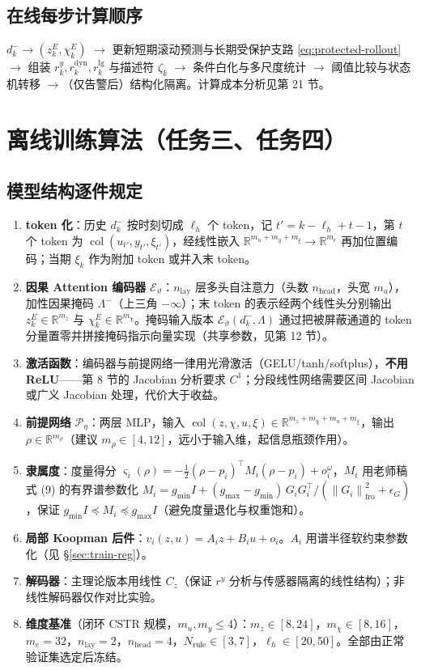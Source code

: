 \documentclass[11pt,a4paper]{ctexart}
\theoremstyle{remark}
\newcommand{\col}{\operatorname{col}}
\newcommand{\R}{\mathbb{R}}
\newcommand{\norm}[1]{\left\|#1\right\|}
\newcommand{\Enc}{\mathcal{E}_{\vartheta}}
\newcommand{\Prem}{\mathcal{P}_{\eta}}
\begin{document}
\subsection{在线每步计算顺序}

$d^-_k\to(z^E_k,\chi^E_k)$ $\to$ 更新短期滚动预测与长期受保护支路 \eqref{eq:protected-rollout} $\to$ 组装 $r^y_k,r^{\mathrm{dyn}}_{k},r^{\mathrm{lg}}_k$ 与描述符 $\zeta_k$ $\to$ 条件白化与多尺度统计 $\to$ 阈值比较与状态机转移 $\to$（仅告警后）结构化隔离。计算成本分析见第 21 节。

\section{离线训练算法（任务三、任务四）}

\subsection{模型结构逐件规定}

\begin{enumerate}
\item \textbf{token 化}：历史 $d^-_k$ 按时刻切成 $\ell_h$ 个 token，记 $t'=k-\ell_h+t-1$，第 $t$ 个 token 为 $\col(u_{t'},y_{t'},\xi_{t'})$，经线性嵌入 $\R^{m_u+m_y+m_\xi}\to\R^{m_e}$ 再加位置编码；当期 $\xi_k$ 作为附加 token 或并入末 token。
\item \textbf{因果 Attention 编码器} $\Enc$：$n_{\mathrm{lay}}$ 层多头自注意力（头数 $n_{\mathrm{head}}$，头宽 $m_a$），加性因果掩码 $\Lambda^-$（上三角 $-\infty$）；末 token 的表示经两个线性头分别输出 $z^E_k\in\R^{m_z}$ 与 $\chi^E_k\in\R^{m_\chi}$。掩码输入版本 $\Enc(d^-_k,\Lambda)$ 通过把被屏蔽通道的 token 分量置零并拼接掩码指示向量实现（共享参数，见第 12 节）。
\item \textbf{激活函数}：编码器与前提网络一律用光滑激活（GELU/tanh/softplus），\textbf{不用 ReLU}——第 8 节的 Jacobian 分析要求 $C^1$；分段线性网络需要区间 Jacobian 或广义 Jacobian 处理，代价大于收益。
\item \textbf{前提网络} $\Prem$：两层 MLP，输入 $\col(z,\chi,u,\xi)\in\R^{m_z+m_\chi+m_u+m_\xi}$，输出 $\rho\in\R^{m_\rho}$（建议 $m_\rho\in[4,12]$，远小于输入维，起信息瓶颈作用）。
\item \textbf{隶属度}：度量得分 $\varsigma_i(\rho)=-\tfrac12(\rho-p_i)^\top M_i(\rho-p_i)+o^\omega_i$，$M_i$ 用老师稿式 (9) 的有界谱参数化 $M_i=g_{\min}I+(g_{\max}-g_{\min})\,G_iG_i^\top/(\norm{G_i}^2_{\mathrm{fro}}+\epsilon_G)$，保证 $g_{\min}I\preceq M_i\preceq g_{\max}I$（避免度量退化与权重饱和）。
\item \textbf{局部 Koopman 后件}：$v_i(z,u)=A_iz+B_iu+o_i$。$A_i$ 用谱半径软约束参数化（见 \S\ref{sec:train-reg}）。
\item \textbf{解码器}：主理论版本用线性 $C_z$（保证 $r^y$ 分析与传感器隔离的线性结构）；非线性解码器仅作对比实验。
\item \textbf{维度基准}（闭环 CSTR 规模，$m_u,m_y\le 4$）：$m_z\in[8,24]$，$m_\chi\in[8,16]$，$m_e=32$，$n_{\mathrm{lay}}=2$，$n_{\mathrm{head}}=4$，$N_{\mathrm{rule}}\in[3,7]$，$\ell_h\in[20,50]$。全部由正常验证集选定后冻结。
\end{enumerate}
\end{document}
